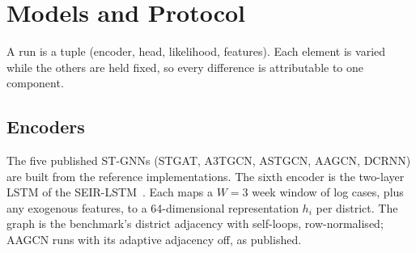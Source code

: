 \section{Models and Protocol}
\label{sec:models}

A run is a tuple (encoder, head, likelihood, features). Each element is varied
while the others are held fixed, so every difference is attributable to one
component.

\subsection{Encoders}
The five published ST-GNNs (STGAT, A3TGCN, ASTGCN, AAGCN, DCRNN) are built from
the reference implementations. The sixth encoder is the two-layer LSTM of the
SEIR-LSTM~\cite{liu2025seirlstm}. Each maps a $W=3$ week window of log cases,
plus any exogenous features, to a 64-dimensional representation $h_i$ per
district. The graph is the benchmark's district adjacency with self-loops,
row-normalised; AAGCN runs with its adaptive adjacency off, as published.

